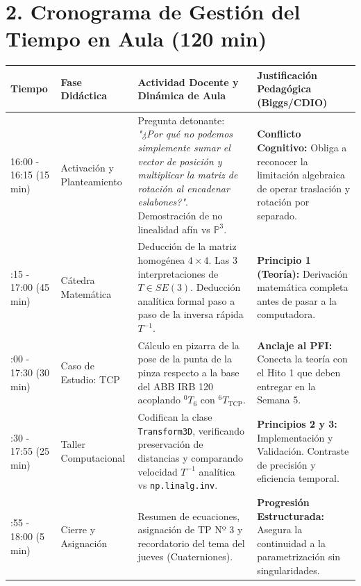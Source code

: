 \documentclass[11pt, a4paper]{article}
\begin{document}
\section*{2. Cronograma de Gestión del Tiempo en Aula (120 min)}
\noindent
\begin{tabularx}{\textwidth}{@{} l >{\raggedright\arraybackslash}p{3cm} X X @{}}
\toprule
\textbf{Tiempo} & \textbf{Fase Didáctica} & \textbf{Actividad Docente y Dinámica de Aula} & \textbf{Justificación Pedagógica (Biggs/CDIO)} \\ \midrule
16:00 - 16:15 \newline (15 min) & Activación y Planteamiento & Pregunta detonante: \textit{"¿Por qué no podemos simplemente sumar el vector de posición y multiplicar la matriz de rotación al encadenar eslabones?"}. Demostración de no linealidad afín vs $\mathbb{P}^3$. & \textbf{Conflicto Cognitivo:} Obliga a reconocer la limitación algebraica de operar traslación y rotación por separado. \\ \addlinespace
16:15 - 17:00 \newline (45 min) & Cátedra Matemática & Deducción de la matriz homogénea $4 \times 4$. Las 3 interpretaciones de $T \in SE(3)$. Deducción analítica formal paso a paso de la inversa rápida $T^{-1}$. & \textbf{Principio 1 (Teoría):} Derivación matemática completa antes de pasar a la computadora. \\ \addlinespace
17:00 - 17:30 \newline (30 min) & Caso de Estudio: TCP & Cálculo en pizarra de la pose de la punta de la pinza respecto a la base del ABB IRB 120 acoplando $^{0}T_6$ con $^{6}T_{\text{TCP}}$. & \textbf{Anclaje al PFI:} Conecta la teoría con el Hito 1 que deben entregar en la Semana 5. \\ \addlinespace
17:30 - 17:55 \newline (25 min) & Taller Computacional & Codifican la clase \texttt{Transform3D}, verificando preservación de distancias y comparando velocidad $T^{-1}$ analítica vs \texttt{np.linalg.inv}. & \textbf{Principios 2 y 3:} Implementación y Validación. Contraste de precisión y eficiencia temporal. \\ \addlinespace
17:55 - 18:00 \newline (5 min) & Cierre y Asignación & Resumen de ecuaciones, asignación de TP Nº 3 y recordatorio del tema del jueves (Cuaterniones). & \textbf{Progresión Estructurada:} Asegura la continuidad a la parametrización sin singularidades. \\ \bottomrule
\end{tabularx}
\end{document}
